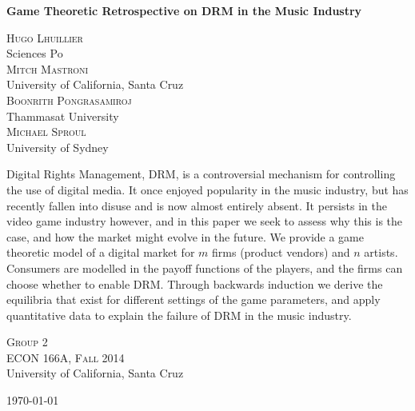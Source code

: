 \documentclass[letter,12pt]{article}
\numberwithin{equation}{section}
\renewenvironment{abstract}
 {\normalsize
  \begin{center}
  \bfseries \abstractname\vspace{-.5em}\vspace{0pt}
  \end{center}
  \list{}{%
    \setlength{\leftmargin}{20mm}%
    \setlength{\rightmargin}{\leftmargin}%
  }%
  \item\relax}
 {\endlist}
\begin{document}
\begin{titlepage}
\begin{center}

\vspace*{3cm}
\Large
\begin{changemargin}{2cm}{2cm}
\begin{center}
\textbf{Game Theoretic Retrospective on DRM in the Music Industry}
\end{center}
\end{changemargin}

\vspace*{0.5cm}
\large
\textsc{Hugo Lhuillier}\\
Sciences Po\\[1.2em]
\textsc{Mitch Mastroni}\\
University of California, Santa Cruz\\[1.2em]
\textsc{Boonrith Pongrasamiroj}\\
Thammasat University\\[1.2em]
\textsc{Michael Sproul}\\
University of Sydney

\vspace*{1cm}
\begin{abstract}
Digital Rights Management, DRM, is a controversial mechanism for controlling the use of digital media. It once enjoyed popularity in the music industry, but has recently fallen into disuse and is now almost entirely absent. It persists in the video game industry however, and in this paper we seek to assess why this is the case, and how the market might evolve in the future. We provide a game theoretic model of a digital market for $m$ firms (product vendors) and $n$ artists. Consumers are modelled in the payoff functions of the players, and the firms can choose whether to enable DRM. Through backwards induction we derive the equilibria that exist for different settings of the game parameters, and apply quantitative data to explain the failure of DRM in the music industry.
\end{abstract}

\vfill

\normalsize
\textsc{Group 2}\\[1.2em]
\textsc{ECON 166A, Fall 2014}\\
University of California, Santa Cruz

\today

\end{center}
\end{titlepage}
\pagebreak
\end{document}
